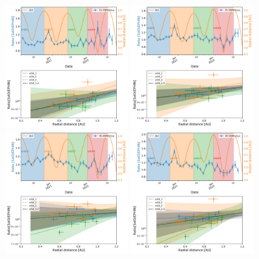 \begin{figure}[!htb]
    \centering
    \includegraphics[width =0.48\textwidth, height = 0.4\textheight]{images/ACR/seperate_mask_1-3_newSOHOSEPmask/ratio_time_radialgradient_10-20MeV.png}
    \includegraphics[width =0.48\textwidth, height = 0.4\textheight]{images/ACR/seperate_mask_1-3_newSOHOSEPmask/ratio_time_radialgradient_20-30MeV.png}
    \includegraphics[width =0.48\textwidth, height = 0.4\textheight]{images/ACR/seperate_mask_1-3_newSOHOSEPmask/ratio_time_radialgradient_30-40MeV.png}
    \includegraphics[width =0.48\textwidth, height = 0.4\textheight]{images/ACR/seperate_mask_1-3_newSOHOSEPmask/ratio_time_radialgradient_40-50MeV.png}

\end{figure}
